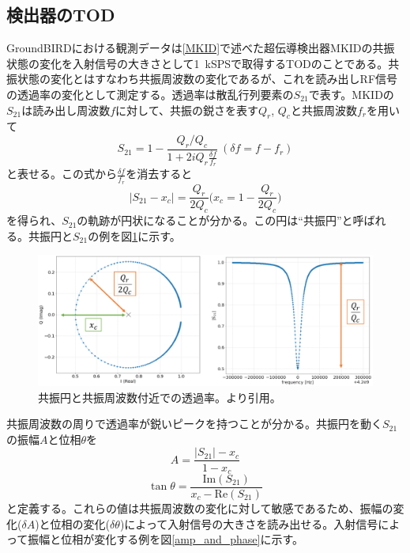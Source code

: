 \subsection{検出器のTOD}
GroundBIRDにおける観測データは\ref{MKID}で述べた超伝導検出器MKIDの共振状態の変化を入射信号の大きさとして\SI{1}{kSPS}で取得するTODのことである。共振状態の変化とはすなわち共振周波数の変化であるが、これを読み出しRF信号の透過率の変化として測定する。透過率は散乱行列要素の$S_{21}$で表す。MKIDの$S_{21}$は読み出し周波数$f$に対して、共振の鋭さを表す$Q_{r}$, $Q_{c}$と共振周波数$f_{r}$を用いて
\begin{equation}
  S_{21} = 1 - \frac{Q_{r}/Q_{c}}{1+2iQ_{r}\frac{\delta f}{f_{r}}} ~ (\delta f = f - f_{r} )
\end{equation}
と表せる。この式から$\frac{\delta f}{f_{r}}$を消去すると
\begin{equation}
  |S_{21}-x_{c}| = \frac{Q_{r}}{2Q_{c}} \biggl(x_{c} = 1-\frac{Q_{r}}{2Q_{c}}\biggr)
\end{equation}
を得られ\cite{muto}、$S_{21}$の軌跡が円状になることが分かる。この円は``共振円''と呼ばれる。共振円と$S_{21}$の例を図\ref{res_circ}に示す。
\begin{figure}[htbp]
  \centering
  \includegraphics[width=1.0\columnwidth]{5_alignment/figs/iq_amp.pdf}
  \caption{共振円と共振周波数付近での透過率。\cite{sueno_master}より引用。}
  \label{res_circ}
\end{figure}
共振周波数の周りで透過率が鋭いピークを持つことが分かる。共振円を動く$S_{21}$の振幅$A$と位相$\theta$を
\begin{equation}
  A = \frac{|S_{21}|- x_{c}}{1-x_{c}}
\end{equation}
\begin{equation}
  \tan\theta = \frac{\mathrm{Im}(S_{21})}{x_{c}- \mathrm{Re}(S_{21})}
\end{equation}
と定義する。これらの値は共振周波数の変化に対して敏感であるため、振幅の変化($\delta A$)と位相の変化($\delta\theta$)によって入射信号の大きさを読み出せる。入射信号によって振幅と位相が変化する例を図\ref{amp_and_phase}に示す。
